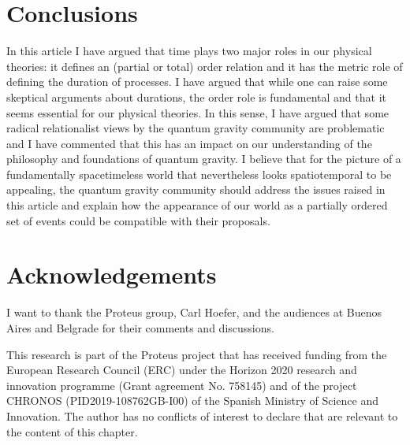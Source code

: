 \documentclass[12 pt]{article}
\begin{document}
\section{Conclusions}

In this article I have argued that time plays two major roles in our physical theories: it defines an (partial or total) order relation and it has the metric role of defining the duration of processes. I have argued that while one can raise some skeptical arguments about durations, the order role is fundamental and that it seems essential for our physical theories. In this sense, I have argued that some radical relationalist views by the quantum gravity community are problematic and I have commented that this has an impact on our understanding of the philosophy and foundations of quantum gravity. I believe that for the picture of a fundamentally spacetimeless world that nevertheless looks spatiotemporal to be appealing, the quantum gravity community should address the issues raised in this article and explain how the appearance of our world as a partially ordered set of events could be compatible with their proposals.




\section*{Acknowledgements}
I want to thank the Proteus group, Carl Hoefer, and the audiences at Buenos Aires and Belgrade for their comments and discussions. 

This research is part of the Proteus project that has received funding from the European Research Council (ERC) under the  Horizon 2020 research and innovation programme (Grant agreement No. 758145) and of the project CHRONOS (PID2019-108762GB-I00) of the Spanish Ministry of Science and Innovation.
The author has no conflicts of interest to declare that are relevant to the content of this chapter.

%



%

\printbibliography



  
\end{document}
